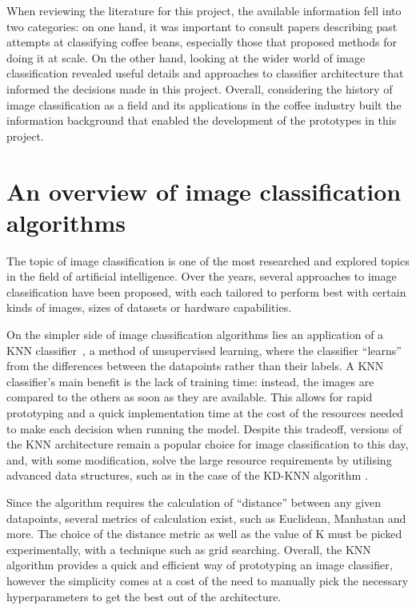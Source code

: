 When reviewing the literature for this project, the available information fell into
two categories: on one hand, it was important to consult papers describing past attempts
at classifying coffee beans, especially those that proposed methods for doing it
at scale. On the other hand, looking at the wider world of image classification
revealed useful details and approaches to classifier architecture that informed
the decisions made in this project. Overall, considering the history of image
classification as a field and its applications in the coffee industry built the
information background that enabled the development of the prototypes in this
project.

\section{An overview of image classification algorithms}
\label{sec:lit-review-general} The topic of image classification is one of the
most researched and explored topics in the field of artificial intelligence. Over
the years, several approaches to image classification have been proposed, with each
tailored to perform best with certain kinds of images, sizes of datasets or
hardware capabilities.

On the simpler side of image classification algorithms lies an application of a
KNN classifier~\cite{knnOverview}, a method of unsupervised learning, where the
classifier ``learns'' from the differences between the datapoints rather than
their labels. A KNN classifier's main benefit is the lack of training time:
instead, the images are compared to the others as soon as they are available.
This allows for rapid prototyping and a quick implementation time at the cost of
the resources needed to make each decision when running the model. Despite this tradeoff,
versions of the KNN architecture remain a popular choice for image
classification to this day, and, with some modification, solve the large resource
requirements by utilising advanced data structures, such as in the case of the
KD-KNN algorithm \cite{kdtreeKNN}.

Since the algorithm requires the calculation of ``distance'' between any given
datapoints, several metrics of calculation exist, such as Euclidean, Manhatan and
more. The choice of the distance metric as well as the value of K must be picked
experimentally, with a technique such as grid searching. Overall, the KNN algorithm
provides a quick and efficient way of prototyping an image classifier, however
the simplicity comes at a cost of the need to manually pick the necessary
hyperparameters to get the best out of the architecture.

